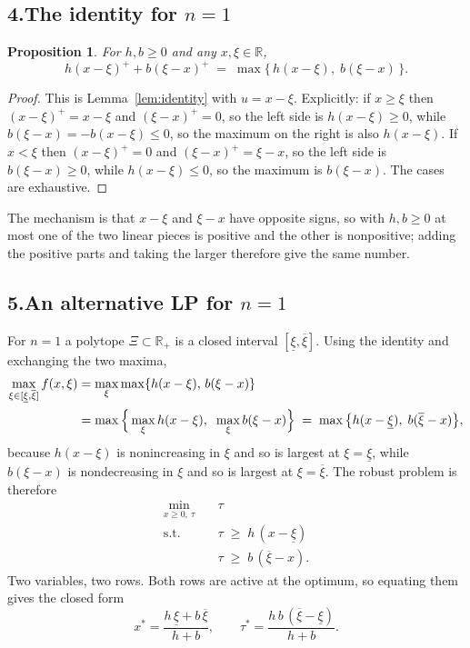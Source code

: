 \documentclass[11pt]{article}
\DeclareMathOperator*{\minimize}{min}
\newtheorem{proposition}{Proposition}
\theoremstyle{definition}
\begin{document}
\subsection*{4.\quad The identity for $n=1$}

\begin{proposition}
For $h,b \ge 0$ and any $x,\xi \in \mathbb{R}$,
\[
  h(x-\xi)^{+} + b(\xi-x)^{+} \;=\; \max\{\, h(x-\xi),\; b(\xi-x) \,\}.
\]
\end{proposition}

\begin{proof}
This is Lemma~\ref{lem:identity} with $u = x-\xi$. Explicitly: if
$x \ge \xi$ then $(x-\xi)^{+} = x-\xi$ and $(\xi-x)^{+} = 0$, so the left
side is $h(x-\xi) \ge 0$, while $b(\xi-x) = -b(x-\xi) \le 0$, so the
maximum on the right is also $h(x-\xi)$. If $x < \xi$ then
$(x-\xi)^{+} = 0$ and $(\xi-x)^{+} = \xi-x$, so the left side is
$b(\xi-x) \ge 0$, while $h(x-\xi) \le 0$, so the maximum is $b(\xi-x)$.
The cases are exhaustive.
\end{proof}

The mechanism is that $x-\xi$ and $\xi-x$ have opposite signs, so with
$h,b \ge 0$ at most one of the two linear pieces is positive and the other
is nonpositive; adding the positive parts and taking the larger therefore
give the same number.

\subsection*{5.\quad An alternative LP for $n=1$}

For $n=1$ a polytope $\Xi \subset \mathbb{R}_+$ is a closed interval
$[\underline{\xi},\overline{\xi}]$. Using the identity and exchanging the
two maxima,
\begin{align}
  \max_{\xi \in [\underline{\xi},\overline{\xi}]} f(x,\xi)
  &= \max_{\xi} \max\{ h(x-\xi),\, b(\xi-x) \} \notag\\
  &= \max\Big\{ \max_{\xi} h(x-\xi), \;\; \max_{\xi} b(\xi-x) \Big\}
  \;=\; \max\big\{ h(x-\underline{\xi}),\; b(\overline{\xi}-x) \big\},
  \label{eq:n1swap}
\end{align}
because $h(x-\xi)$ is nonincreasing in $\xi$ and so is largest at
$\xi = \underline{\xi}$, while $b(\xi-x)$ is nondecreasing in $\xi$ and so
is largest at $\xi = \overline{\xi}$. The robust problem is therefore
\begin{align}
  \minimize_{x \ge 0,\ \tau} \quad & \tau \\
  \text{s.t.}\quad & \tau \;\ge\; h\,(x - \underline{\xi}) \\
                   & \tau \;\ge\; b\,(\overline{\xi} - x) .
\end{align}
Two variables, two rows. Both rows are active at the optimum, so equating
them gives the closed form
\begin{equation}
  x^{*} = \frac{h\,\underline{\xi} + b\,\overline{\xi}}{h+b},
  \qquad
  \tau^{*} = \frac{h\,b\,(\overline{\xi}-\underline{\xi})}{h+b}.
  \label{eq:n1closed}
\end{equation}
\end{document}
